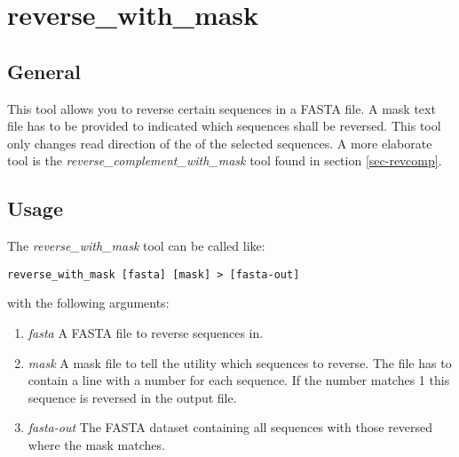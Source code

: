 \section{reverse\_with\_mask}

\subsection{General}

This tool allows you to reverse certain sequences in a FASTA file. A
mask text file has to be provided to indicated which sequences shall
be reversed. This tool only changes read direction of the of the
selected sequences. A more elaborate tool is the
\emph{reverse\_complement\_with\_mask} tool found in section \ref{sec-revcomp}.

\subsection{Usage}

The \emph{reverse\_with\_mask} tool can be called like:
\begin{lstlisting}
reverse_with_mask [fasta] [mask] > [fasta-out]
\end{lstlisting}
with the following arguments:
\begin{enumerate}
  \item \emph{fasta} A FASTA file to reverse sequences in.
  \item \emph{mask} A mask file to tell the utility which sequences to
    reverse. The file has to contain a line with a number for each
    sequence. If the number matches 1 this sequence is reversed in the
    output file.
  \item \emph{fasta-out} The FASTA dataset containing all sequences
    with those reversed where the mask matches.
\end{enumerate}

